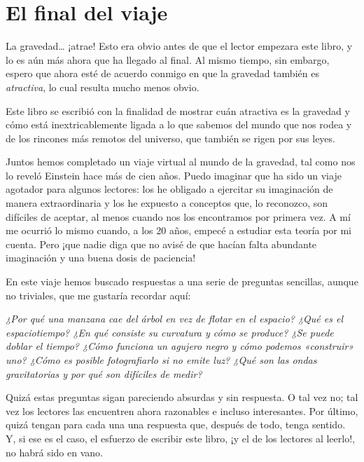 \chapter*{El final del viaje}\label{conclusion}

La gravedad\ldots{} ¡atrae! Esto era obvio antes de que el lector empezara este libro, y lo es aún más ahora que ha llegado al final. Al mismo tiempo, sin embargo, espero que ahora esté de acuerdo conmigo en que la gravedad también es \emph{atractiva}, lo cual resulta mucho menos obvio.

Este libro se escribió con la finalidad de mostrar cuán atractiva es la gravedad y cómo está inextricablemente ligada a lo que sabemos del mundo que nos rodea y de los rincones más remotos del universo, que también se rigen por sus leyes.

Juntos hemos completado un viaje virtual al mundo de la gravedad, tal como nos lo reveló Einstein hace más de cien años. Puedo imaginar que ha sido un viaje agotador para algunos lectores: los he obligado a ejercitar su imaginación de manera extraordinaria y los he expuesto a conceptos que, lo reconozco, son difíciles de aceptar, al menos cuando nos los encontramos por primera vez. A mí me ocurrió lo mismo cuando, a los 20 años, empecé a estudiar esta teoría por mi cuenta. Pero ¡que nadie diga que no avisé de que hacían falta abundante imaginación y una buena dosis de paciencia!

En este viaje hemos buscado respuestas a una serie de preguntas sencillas, aunque no triviales, que me gustaría recordar aquí:

\emph{¿Por qué una manzana cae del árbol en vez de flotar en el espacio? ¿Qué es el espaciotiempo? ¿En qué consiste su curvatura y cómo se produce? ¿Se puede doblar el tiempo? ¿Cómo funciona un agujero negro y cómo podemos «construir» uno? ¿Cómo es posible fotografiarlo si no emite luz? ¿Qué son las ondas gravitatorias y por qué son difíciles de medir?}

Quizá estas preguntas sigan pareciendo absurdas y sin respuesta. O tal vez no; tal vez los lectores las encuentren ahora razonables e incluso interesantes. Por último, quizá tengan para cada una una respuesta que, después de todo, tenga sentido. Y, si ese es el caso, el esfuerzo de escribir este libro, ¡y el de los lectores al leerlo!, no habrá sido en vano.

